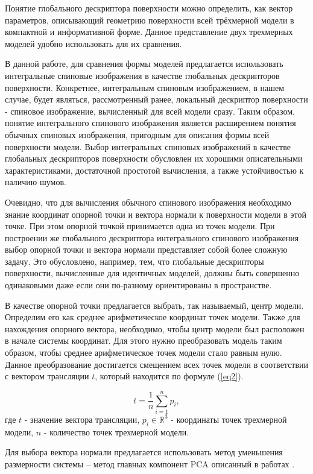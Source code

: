 \documentclass[14pt]{article}
\numberwithin{figure}{section}
\numberwithin{equation}{section}
\begin{document}
Понятие глобального дескриптора поверхности можно определить, как вектор параметров, описывающий геометрию поверхности всей трёхмерной модели в компактной и информативной форме. Данное представление двух трехмерных моделей удобно использовать для их сравнения.

В данной работе, для сравнения формы моделей предлагается использовать интегральные спиновые изображения в качестве глобальных дескрипторов поверхности. Конкретнее, интегральным спиновым изображением, в нашем случае, будет являться, рассмотренный ранее, локальный дескриптор поверхности - спиновое изображение, вычисленный для всей модели сразу. Таким образом, понятие интегрального спинового изображения является расширением понятия обычных спиновых изображения, пригодным для описания формы всей поверхности модели.
Выбор интегральных спиновых изображений в качестве глобальных дескрипторов поверхности обусловлен их хорошими описательными характеристиками, достаточной простотой вычисления, а также устойчивостью к наличию шумов.

Очевидно, что для вычисления обычного спинового изображения необходимо знание координат опорной точки и вектора нормали к поверхности модели в этой точке. При этом опорной точкой принимается одна из точек модели. При построении же глобального дескриптора интегрального спинового изображения выбор опорной точки и вектора нормали представляет собой более сложную задачу. Это обусловлено, например, тем, что глобальные дескрипторы поверхности, вычисленные для идентичных моделей, должны быть совершенно одинаковыми даже если они по-разному ориентированы в пространстве.

В качестве опорной точки предлагается выбрать, так называемый, центр модели. Определим его как среднее арифметическое координат точек модели. Также для нахождения опорного вектора, необходимо, чтобы центр модели был расположен в начале системы координат. Для этого нужно преобразовать модель таким образом, чтобы среднее арифметическое точек модели стало равным нулю. Данное преобразование достигается смещением всех точек модели в соответствии с вектором трансляции $t$, который находится по формуле (\ref{eq2}).

\begin{equation}\label{eq2}
	t = \frac{1}{n}\sum\limits^{n}_{i = 1} p_i,
\end{equation}
где $t$ - значение вектора трансляции, $p_i \in \mathbb{R}^3$ - координаты точек трехмерной модели, $n$ - количество точек трехмерной модели.

Для выбора вектора нормали предлагается использовать метод уменьшения размерности системы – метод главных компонент PCA описанный в работах \cite{Chernikoff}.
\end{document}
